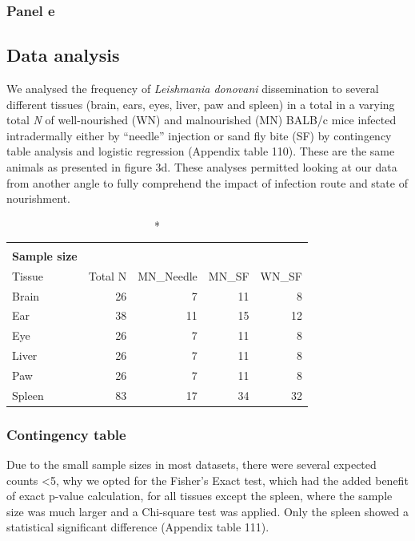 \documentclass[
  12pt,
  letterpaper,
]{article}
\begin{document}
\subsubsection{Panel e}\label{panel-e-1}

\subsection{Data analysis}\label{data-analysis-6}

We analysed the frequency of \emph{Leishmania donovani} dissemination to several different tissues (brain, ears, eyes, liver, paw and spleen) in a total in a varying total \emph{N} of well-nourished (WN) and malnourished (MN) BALB/c mice infected intradermally either by ``needle'' injection or sand fly bite (SF) by contingency table analysis and logistic regression (Appendix table 110). These are the same animals as presented in figure 3d. These analyses permitted looking at our data from another angle to fully comprehend the impact of infection route and state of nourishment.

\begin{longtable}{l|rrrr}
\caption*{
{\large \textbf{Appendix Table 110}} \\ 
{\small \textbf{Sample size}}
} \\ 
\toprule
\multicolumn{1}{l}{Tissue} & Total N & MN\_Needle & MN\_SF & WN\_SF \\ 
\midrule\addlinespace[2.5pt]
Brain & 26 & 7 & 11 & 8 \\ 
Ear & 38 & 11 & 15 & 12 \\ 
Eye & 26 & 7 & 11 & 8 \\ 
Liver & 26 & 7 & 11 & 8 \\ 
Paw & 26 & 7 & 11 & 8 \\ 
Spleen & 83 & 17 & 34 & 32 \\ 
\bottomrule
\end{longtable}

\subsubsection{Contingency table}\label{contingency-table-3}

Due to the small sample sizes in most datasets, there were several expected counts \textless5, why we opted for the Fisher's Exact test, which had the added benefit of exact p-value calculation, for all tissues except the spleen, where the sample size was much larger and a Chi-square test was applied. Only the spleen showed a statistical significant difference (Appendix table 111).
\end{document}

